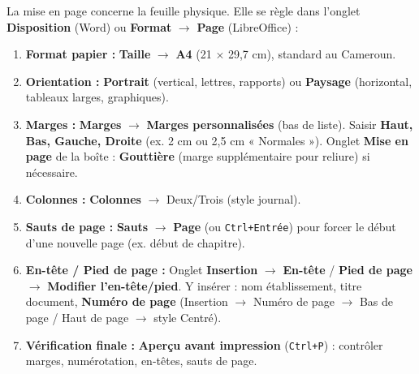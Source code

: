 \documentclass[11pt]{article}
\newcommand{\cle}[1]{{\popxbold\color{popdark}#1}}
\begin{document}
\begin{methode}
La \cle{mise en page} concerne la feuille physique. Elle se règle dans l'onglet \textbf{Disposition} (Word) ou \textbf{Format} $\rightarrow$ \textbf{Page} (LibreOffice) :
\begin{enumerate}
  \item \textbf{Format papier :} \textbf{Taille} $\rightarrow$ \textbf{A4} (21 $\times$ 29,7 cm), standard au Cameroun.
  \item \textbf{Orientation :} \textbf{Portrait} (vertical, lettres, rapports) ou \textbf{Paysage} (horizontal, tableaux larges, graphiques).
  \item \textbf{Marges :} \textbf{Marges} $\rightarrow$ \textbf{Marges personnalisées} (bas de liste). Saisir \textbf{Haut, Bas, Gauche, Droite} (ex. 2 cm ou 2,5 cm « Normales »). Onglet \textbf{Mise en page} de la boîte : \textbf{Gouttière} (marge supplémentaire pour reliure) si nécessaire.
  \item \textbf{Colonnes :} \textbf{Colonnes} $\rightarrow$ Deux/Trois (style journal).
  \item \textbf{Sauts de page :} \textbf{Sauts} $\rightarrow$ \textbf{Page} (ou \texttt{Ctrl+Entrée}) pour forcer le début d'une nouvelle page (ex. début de chapitre).
  \item \textbf{En-tête / Pied de page :} Onglet \textbf{Insertion} $\rightarrow$ \textbf{En-tête} / \textbf{Pied de page} $\rightarrow$ \textbf{Modifier l'en-tête/pied}. Y insérer : nom établissement, titre document, \textbf{Numéro de page} (Insertion $\rightarrow$ Numéro de page $\rightarrow$ Bas de page / Haut de page $\rightarrow$ style Centré).
  \item \textbf{Vérification finale :} \textbf{Aperçu avant impression} (\texttt{Ctrl+P}) : contrôler marges, numérotation, en-têtes, sauts de page.
\end{enumerate}
\end{methode}
\end{document}
